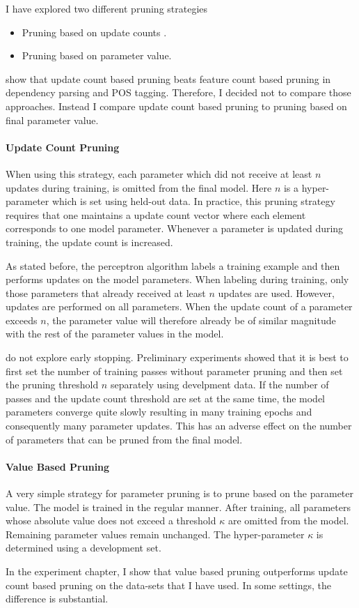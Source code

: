I have explored two different pruning strategies
\begin{itemize}
\item Pruning based on update counts \citep{Goldberg2011}.
\item Pruning based on parameter value.
\end{itemize}
\cite{Goldberg2011} show that update count based pruning beats feature
count based pruning in dependency parsing and POS tagging. Therefore,
I decided not to compare those approaches. Instead I compare update
count based pruning to pruning based on final parameter value.

\paragraph{Update Count Pruning} When using this strategy, each
parameter which did not receive at least $n$ updates during training,
is omitted from the final model. Here $n$ is a hyper-parameter which
is set using held-out data. In practice, this pruning strategy
requires that one maintains a update count vector where each element
corresponds to one model parameter. Whenever a parameter is updated
during training, the update count is increased.

As stated before, the perceptron algorithm labels a training example
and then performs updates on the model parameters. When labeling
during training, only those parameters that already received at least
$n$ updates are used. However, updates are performed on all
parameters. When the update count of a parameter exceeds $n$, the
parameter value will therefore already be of similar magnitude with
the rest of the parameter values in the model.

\citep{Goldberg2011} do not explore early stopping. Preliminary
experiments showed that it is best to first set the number of training
passes without parameter pruning and then set the pruning threshold
$n$ separately using develpment data. If the number of passes and the
update count threshold are set at the same time, the model parameters
converge quite slowly resulting in many training epochs and
consequently many parameter updates. This has an adverse effect on the
number of parameters that can be pruned from the final model.

\paragraph{Value Based Pruning} A very simple strategy for
parameter pruning is to prune based on the parameter value. The model
is trained in the regular manner. After training, all parameters whose
absolute value does not exceed a threshold $\kappa$ are omitted from
the model. Remaining parameter values remain unchanged. The
hyper-parameter $\kappa$ is determined using a development set.

In the experiment chapter, I show that value based pruning outperforms
update count based pruning on the data-sets that I have used. In some
settings, the difference is substantial.
